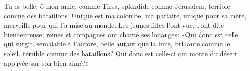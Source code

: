 Tu es belle, ô mon amie, comme Tirsa,
	splendide comme Jérusalem, terrible comme des bataillons!
Unique est ma colombe, ma parfaite,
	unique pour sa mère, merveille pour qui l’a mise au monde.
Les jeunes filles l’ont vue, l’ont dite bienheureuse;
	reines et compagnes ont chanté ses louanges:
	«Qui donc est celle qui surgit, semblable à l’aurore,
	belle autant que la lune, brillante comme le soleil,
		terrible comme des bataillons?
	Qui donc est celle-ci qui monte du désert
		appuyée sur son bien-aimé?»

